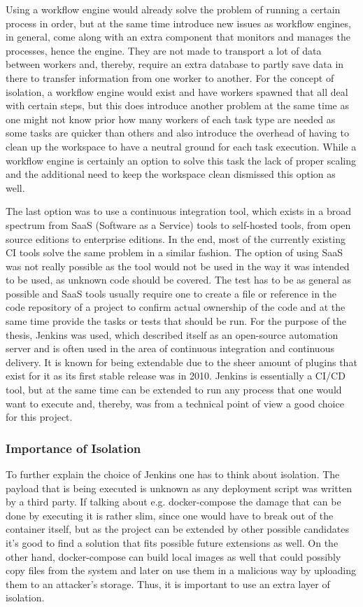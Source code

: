 Using a workflow engine would already solve the problem of running a certain process in order, but at the same time introduce new issues as workflow engines, in general, come along with an extra component that monitors and manages the processes, hence the engine. They are not made to transport a lot of data between workers and, thereby, require an extra database to partly save data in there to transfer information from one worker to another. For the concept of isolation, a workflow engine would exist and have workers spawned that all deal with certain steps, but this does introduce another problem at the same time as one might not know prior how many workers of each task type are needed as some tasks are quicker than others and also introduce the overhead of having to clean up the workspace to have a neutral ground for each task execution. While a workflow engine is certainly an option to solve this task the lack of proper scaling and the additional need to keep the workspace clean dismissed this option as well.

The last option was to use a continuous integration tool, which exists in a broad spectrum from SaaS (Software as a Service) tools to self-hosted tools, from open source editions to enterprise editions. In the end, most of the currently existing CI tools solve the same problem in a similar fashion. The option of using SaaS was not really possible as the tool would not be used in the way it was intended to be used, as unknown code should be covered. The test has to be as general as possible and SaaS tools usually require one to create a file or reference in the code repository of a project to confirm actual ownership of the code and at the same time provide the tasks or tests that should be run.
For the purpose of the thesis, Jenkins was used, which described itself as an open-source automation server and is often used in the area of continuous integration and continuous delivery. It is known for being extendable due to the sheer amount of plugins that exist for it as its first stable release was in 2010. Jenkins is essentially a CI/CD tool, but at the same time can be extended to run any process that one would want to execute and, thereby, was from a technical point of view a good choice for this project.

\subsubsection{Importance of Isolation}
\label{sec:importance_of_isolation}
To further explain the choice of Jenkins one has to think about isolation. The payload that is being executed is unknown as any deployment script was written by a third party. If talking about e.g. docker-compose the damage that can be done by executing it is rather slim, since one would have to break out of the container itself, but as the project can be extended by other possible candidates it's good to find a solution that fits possible future extensions as well. On the other hand, docker-compose can build local images as well that could possibly copy files from the system and later on use them in a malicious way by uploading them to an attacker's storage. Thus, it is important to use an extra layer of isolation.

